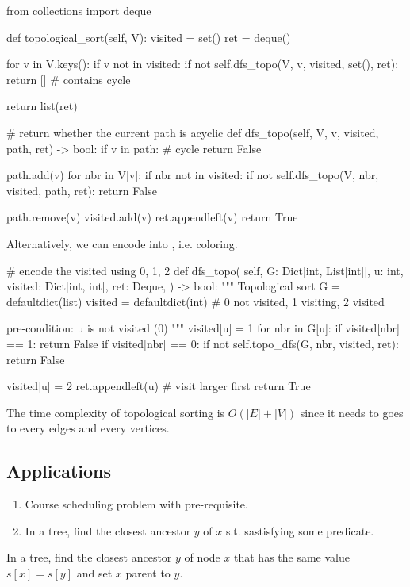 \begin{python}
from collections import deque

def topological_sort(self, V):
  visited = set()
  ret = deque()

  for v in V.keys():
    if v not in visited:
      if not self.dfs_topo(V, v, visited, set(), ret):
        return []  # contains cycle

  return list(ret)

# return whether the current path is acyclic
def dfs_topo(self, V, v, visited, path, ret) -> bool:
  if v in path:  # cycle
    return False

  path.add(v)
  for nbr in V[v]:
    if nbr not in visited:
      if not self.dfs_topo(V, nbr, visited, path, ret):
        return False

  path.remove(v)
  visited.add(v)
  ret.appendleft(v)
  return True
\end{python}
Alternatively, we can encode  into , i.e. coloring. 
\begin{python}
# encode the visited using 0, 1, 2
def dfs_topo(
  self, 
  G: Dict[int, List[int]], 
  u: int, 
  visited: Dict[int, int],
  ret: Deque,
) -> bool:
  """
  Topological sort
  G = defaultdict(list)
  visited = defaultdict(int) 
  # 0 not visited, 1 visiting, 2 visited

  pre-condition: u is not visited (0)
  """
  visited[u] = 1
  for nbr in G[u]:
    if visited[nbr] == 1:
      return False
    if visited[nbr] == 0:
      if not self.topo_dfs(G, nbr, visited, ret):
        return False

  visited[u] = 2
  ret.appendleft(u)  # visit larger first
  return True
\end{python}
The time complexity of topological sorting is $O(|E|+|V|)$ since it needs to goes to every edges and every vertices. 

\subsection{Applications}
\begin{enumerate}
\item Course scheduling problem with pre-requisite.
\item In a tree, find the closest ancestor $y$ of $x$ s.t. sastisfying some predicate. 
\end{enumerate}

In a tree, find the closest ancestor $y$ of node $x$ that has the same value $s[x] = s[y]$ and set $x$ parent to $y$. 

